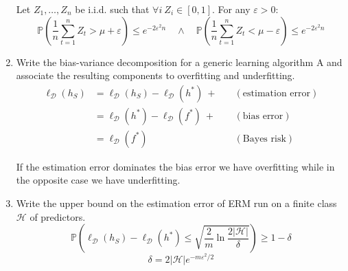 \documentclass[a4paper]{article}
\newcommand{\D}{\ensuremath{\mathcal{D}}}
\newcommand{\Hpred}{\ensuremath{\mathcal{H}}}
\newcommand{\Prob}{\ensuremath{\mathbb{P}}}
\begin{document}
\begin{enumerate}
    Let $Z_1,\dots,Z_n$ be i.i.d. such that $\forall i \  Z_i\in[0,1]$. For any $\varepsilon>0$:
    $$ \Prob\left(\frac{1}{n}\sum_{t=1}^nZ_t>\mu+\varepsilon \right)\leq e^{-2\varepsilon^2n}
    \quad \wedge \quad
       \Prob\left(\frac{1}{n}\sum_{t=1}^nZ_t<\mu-\varepsilon \right)\leq e^{-2\varepsilon^2n}
    $$
    \item Write the bias-variance decomposition for a generic learning algorithm A and associate the
    resulting components to overfitting and underfitting.
    $$ \begin{aligned} 
        \ell_\D(h_S) &= \ell_\D(h_S) - \ell_\D(h^*)\ + & \quad (\text{estimation error})\\
                     &= \ell_\D(h^*) - \ell_\D(f^*)\ + & \quad (\text{bias error})\\
                     &= \ell_\D(f^*)                   & \quad (\text{Bayes risk})
    \end{aligned}$$

    If the estimation error dominates the bias error we have overfitting while in the opposite case
    we have underfitting.
    \item Write the upper bound on the estimation error of ERM run on a finite class $\Hpred$ 
    of predictors.
    $$ \Prob \left( \ell_\D(h_S)-\ell_\D(h^*)\leq\sqrt{\frac{2}{m}\ln{\frac{2|\Hpred|}{\delta}}}\right)
        \geq 1-\delta $$
    $$ \delta = 2|\Hpred|e^{-m\varepsilon^2/2} $$
\end{enumerate}
\end{document}
